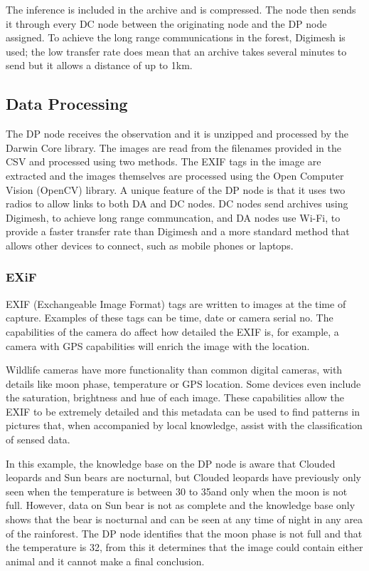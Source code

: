 			The inference is included in the archive and is compressed. The node then sends it through every DC node between the originating node and the DP node assigned. To achieve the long range communications in the forest, Digimesh is used; the low transfer rate does mean that an archive takes several minutes to send but it allows a distance of up to 1km.

	\subsection{Data Processing}			
			The DP node receives the observation and it is unzipped and processed by the Darwin Core library. The images are read from the filenames provided in the CSV and processed using two methods. The EXIF tags in the image are extracted and the images themselves are processed using the Open Computer Vision (OpenCV) library. A unique feature of the DP node is that it uses two radios to allow links to both DA and DC nodes. DC nodes send archives using Digimesh, to achieve long range communcation, and DA nodes use Wi-Fi, to provide a faster transfer rate than Digimesh and a more standard method that allows other devices to connect, such as mobile phones or laptops.
			
		\subsubsection{EXiF}
			EXIF (Exchangeable Image Format) tags are written to images at the time of capture. Examples of these tags can be time, date or camera serial no. The capabilities of the camera do affect how detailed the EXIF is, for example, a camera with GPS capabilities will enrich the image with the location. 
			
			Wildlife cameras have more functionality than common digital cameras, with details like moon phase, temperature or GPS location. Some devices even include the saturation, brightness and hue of each image. These capabilities allow the EXIF to be extremely detailed and this metadata can be used to find patterns in pictures that, when accompanied by local knowledge, assist with the classification of sensed data. 
			
			In this example, the knowledge base on the DP node is aware that Clouded leopards and Sun bears are nocturnal, but Clouded leopards have previously only seen when the temperature is between 30 to 35\celsius and only when the moon is not full. However, data on Sun bear is not as complete and the knowledge base only shows that the bear is nocturnal and can be seen at any time of night in any area of the rainforest. The DP node identifies that the moon phase is not full and that the temperature is 32\celsius, from this it determines that the image could contain either animal and it cannot make a final conclusion.
			
